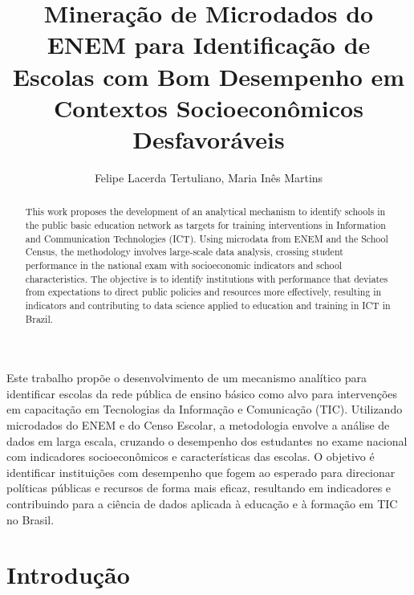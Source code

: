 \documentclass[12pt]{article}
\title{Mineração de Microdados do ENEM para Identificação de Escolas com Bom Desempenho em Contextos Socioeconômicos Desfavoráveis}
\author{Felipe Lacerda Tertuliano\inst{1}, Maria Inês Martins\inst{1}}
\begin{document}
\maketitle

\begin{abstract}

This work proposes the development of an analytical mechanism to identify schools in the public basic education network as targets for training interventions in Information and Communication Technologies (ICT). Using microdata from ENEM and the School Census, the methodology involves large-scale data analysis, crossing student performance in the national exam with socioeconomic indicators and school characteristics. The objective is to identify institutions with performance that deviates from expectations to direct public policies and resources more effectively, resulting in indicators and contributing to data science applied to education and training in ICT in Brazil.

\end{abstract}

\begin{resumo}

Este trabalho propõe o desenvolvimento de um mecanismo analítico para identificar escolas da rede pública de ensino básico como alvo para intervenções em capacitação em Tecnologias da Informação e Comunicação (TIC). Utilizando microdados do ENEM e do Censo Escolar, a metodologia envolve a análise de dados em larga escala, cruzando o desempenho dos estudantes no exame nacional com indicadores socioeconômicos e características das escolas. O objetivo é identificar instituições com desempenho que fogem ao esperado para direcionar políticas públicas e recursos de forma mais eficaz, resultando em indicadores e contribuindo para a ciência de dados aplicada à educação e à formação em TIC no Brasil.

\end{resumo}

\section{Introdução}
\end{document}
